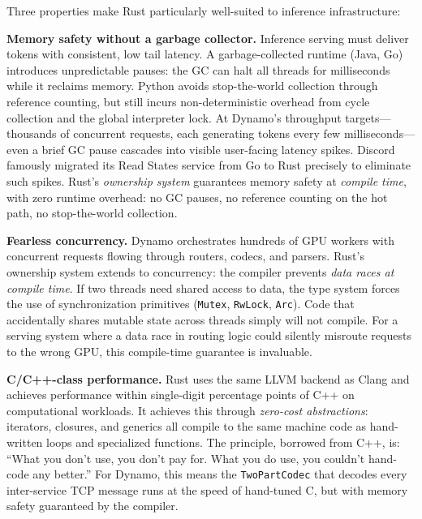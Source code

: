 Three properties make Rust particularly well-suited to inference infrastructure:

\textbf{Memory safety without a garbage collector.}\hspace{1em} Inference serving must deliver tokens with consistent, low tail latency. A garbage-collected runtime (Java, Go) introduces unpredictable pauses: the GC can halt all threads for milliseconds while it reclaims memory. Python avoids stop-the-world collection through reference counting, but still incurs non-deterministic overhead from cycle collection and the global interpreter lock. At Dynamo's throughput targets---thousands of concurrent requests, each generating tokens every few milliseconds---even a brief GC pause cascades into visible user-facing latency spikes. Discord famously migrated its Read States service from Go to Rust precisely to eliminate such spikes. Rust's \emph{ownership system} guarantees memory safety at \emph{compile time}, with zero runtime overhead: no GC pauses, no reference counting on the hot path, no stop-the-world collection.

\textbf{Fearless concurrency.}\hspace{1em} Dynamo orchestrates hundreds of GPU workers with concurrent requests flowing through routers, codecs, and parsers. Rust's ownership system extends to concurrency: the compiler prevents \emph{data races at compile time}. If two threads need shared access to data, the type system forces the use of synchronization primitives (\texttt{Mutex}, \texttt{RwLock}, \texttt{Arc}). Code that accidentally shares mutable state across threads simply will not compile. For a serving system where a data race in routing logic could silently misroute requests to the wrong GPU, this compile-time guarantee is invaluable.

\textbf{C/C++-class performance.}\hspace{1em} Rust uses the same LLVM backend as Clang and achieves performance within single-digit percentage points of C++ on computational workloads. It achieves this through \emph{zero-cost abstractions}: iterators, closures, and generics all compile to the same machine code as hand-written loops and specialized functions. The principle, borrowed from C++, is: ``What you don't use, you don't pay for. What you do use, you couldn't hand-code any better.'' For Dynamo, this means the \texttt{TwoPartCodec} that decodes every inter-service TCP message runs at the speed of hand-tuned C, but with memory safety guaranteed by the compiler.

